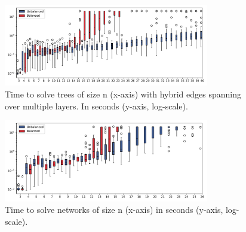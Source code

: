 \documentclass{article}
\begin{document}
 \begin{figure}[H]
    \centering
    \includegraphics[width=0.8\textwidth]{figures/04_perf.pdf}
    \caption{Time to solve trees of size n (x-axis) with hybrid edges spanning over multiple layers. In seconds (y-axis, log-scale).}
    \label{fig:runtime-multi-hybrid}
\end{figure}
\begin{figure}[H]
    \centering
    \includegraphics[width=0.8\textwidth]{figures/05_perf.pdf}
    \caption{Time to solve networks of size n (x-axis) in seconds (y-axis, log-scale).}
    \label{fig:runtime-network}
\end{figure}
\newpage
\printbibliography
\end{document}
